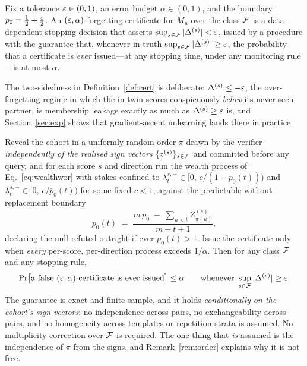 \begin{definition}\label{def:cert}
Fix a tolerance $\varepsilon \in (0,1)$, an error budget $\alpha \in (0,1)$, and the boundary
$p_0 = \tfrac12 + \tfrac{\varepsilon}2$. An $(\varepsilon,\alpha)$-forgetting certificate for $M_u$
over the class $\mathcal{F}$ is a data-dependent stopping decision that asserts
$\sup_{s\in\mathcal{F}}|\Delta^{(s)}| < \varepsilon$, issued by a procedure with the guarantee that,
whenever in truth $\sup_{s\in\mathcal{F}}|\Delta^{(s)}| \ge \varepsilon$, the probability that a
certificate is \emph{ever} issued---at any stopping time, under any monitoring
rule---is at most $\alpha$.
\end{definition}

The two-sidedness in Definition~\ref{def:cert} is deliberate: $\Delta^{(s)} \le -\varepsilon$,
the over-forgetting regime in which the in-twin scores conspicuously \emph{below} its
never-seen partner, is membership leakage exactly as much as $\Delta^{(s)} \ge \varepsilon$
is, and Section~\ref{sec:exp} shows that gradient-ascent unlearning lands there in
practice.

\begin{theorem}\label{thm:cert}
Reveal the cohort in a uniformly random order $\pi$ drawn by the verifier
\emph{independently of the realised sign vectors} $\{z^{(s)}\}_{s\in\mathcal{F}}$ and committed
before any query, and for each score $s$ and direction run the wealth process of
Eq.~\eqref{eq:wealthwor} with stakes confined to
$\lambda_t^{s,+} \in [0,\, c/(1-p_0(t)))$ and
$\lambda_t^{s,-} \in [0,\, c/\bar p_0(t))$ for some fixed $c < 1$, against the
predictable without-replacement boundary
\begin{equation}\label{eq:worboundary}
p_0(t) \;=\; \frac{m\,p_0 \;-\; \sum_{u<t} Z^{(s)}_{\pi(u)}}{m-t+1},
\end{equation}
declaring the null refuted outright if ever $p_0(t) > 1$. Issue the certificate only
when \emph{every} per-score, per-direction process exceeds $1/\alpha$. Then for any
class $\mathcal{F}$ and any stopping rule,
\[
\Pr\bigl[\text{a false }(\varepsilon,\alpha)\text{-certificate is ever issued}\bigr] \le \alpha
\qquad\text{whenever } \sup_{s\in\mathcal{F}}|\Delta^{(s)}| \ge \varepsilon .
\]
The guarantee is exact and finite-sample, and it holds \emph{conditionally on the
cohort's sign vectors}: no independence across pairs, no exchangeability across
pairs, and no homogeneity across templates or repetition strata is assumed. No
multiplicity correction over $\mathcal{F}$ is required. The one thing that \emph{is} assumed
is the independence of $\pi$ from the signs, and Remark~\ref{rem:order} explains why
it is not free.
\end{theorem}

